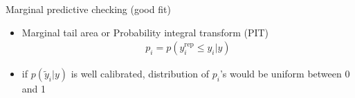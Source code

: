 \documentclass[t]{beamer}
\DeclareMathOperator{\rep}{\mathrm{rep}}
\begin{document}
\begin{frame}{Marginal predictive checking (good fit)}

  \vspace{-0.5\baselineskip}
  \begin{itemize}
  \item Marginal tail area or Probability integral transform (PIT)
    \begin{align*}
      p_i = p(y_i^{\rep} \leq y_i | y)
    \end{align*}
  \item if $p(\tilde{y}_i|y)$ is well calibrated, distribution of $p_i$'s
    would be uniform between 0 and 1
  \end{itemize}
  \vspace{-1\baselineskip}


\end{frame}
\end{document}
